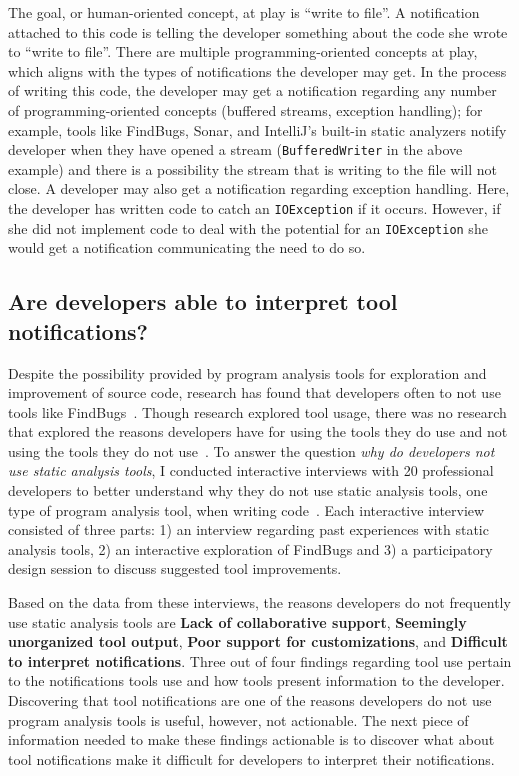 \documentclass{llncs}
\begin{document}
The goal, or human-oriented concept, at play is ``write to file''. 
A notification attached to this code is telling the developer something about the code she wrote to ``write to file''.
There are multiple programming-oriented concepts at play, which aligns with the types of notifications the developer may get. 
In the process of writing this code, the developer may get a notification regarding any number of programming-oriented concepts (buffered streams, exception handling); for example, tools like FindBugs, Sonar, and IntelliJ's built-in static analyzers notify developer when they have opened a stream (\texttt{BufferedWriter} in the above example) and there is a possibility the stream that is writing to the file will not close.
A developer may also get a notification regarding exception handling. Here, the developer has written code to catch an \texttt{IOException} if it occurs. However, if she did not implement code to deal with the potential for an \texttt{IOException} she would get a notification communicating the need to do so.



\subsection{Are developers able to interpret tool notifications?}
Despite the possibility provided by program analysis tools for exploration and improvement of source code, research has found that developers often to not use tools like FindBugs~\cite{Ayewah:2008:FindBugs}.
Though research explored tool usage, there was no research that explored the reasons developers have for using the tools they do use and not using the tools they do not use~\cite{Bessey:2010:Coverity,Khoo:2008:PathProjection}.
To answer the question \emph{why do developers not use static analysis tools}, I conducted interactive interviews with 20 professional developers to better understand why they do not use static analysis tools, one type of program analysis tool, when writing code~\cite{johnson2013don}.
Each interactive interview consisted of three parts: 1) an interview regarding past experiences with static analysis tools, 2) an interactive exploration of FindBugs and 3) a participatory design session to discuss suggested tool improvements.

Based on the data from these interviews, the reasons developers do not frequently use static analysis tools are \textbf{Lack of collaborative support}, \textbf{Seemingly unorganized tool output}, \textbf{Poor support for customizations}, and \textbf{Difficult to interpret notifications}. 
Three out of four findings regarding tool use pertain to the notifications tools use and how tools present information to the developer.
Discovering that tool notifications are one of the reasons developers do not use program analysis tools is useful, however, not actionable. The next piece of information needed to make these findings actionable is to discover what about tool notifications make it difficult for developers to interpret their notifications.
\end{document}
